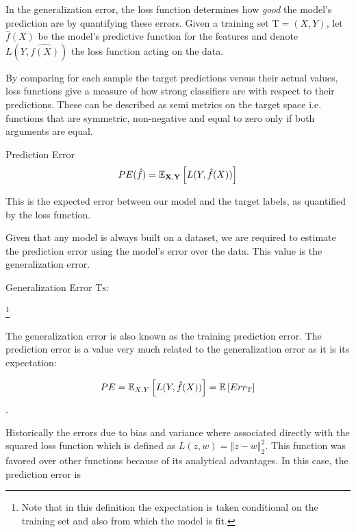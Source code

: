In the generalization error, the loss function  determines how \textit{good} the model's prediction are by quantifying these errors. Given a training set $\mathrm{T} = (X,Y)$, let $\hat{f}(X)$ be the model's predictive function for the features and denote $L( Y,\hat{f(X)} )$ the loss function acting on the data.

By comparing for each sample the target predictions versus their actual values, loss functions give a measure of how strong classifiers are with respect to their predictions. These can be described as semi metrics on the target space i.e. functions that are symmetric, non-negative and equal to zero only if both arguments are equal.


\begin{definition}{Prediction Error}
\[ 
 PE(\hat{f})= \operatorname{\mathbb{E}}_{\textbf{X},\textbf{Y}} \left[ L(Y,\hat{f}(X))\right]
\]
\end{definition}

This is the expected error between our model and the target labels, as quantified by the loss function.

Given that any model is always built on a dataset, we are required to estimate the prediction error using the model's error over the data.  This value is the generalization error.

\begin{definition}{Generalization Error}
 $\mathrm{Ts}$:
\[ 
\]
\end{definition}\footnote{Note that in this definition the expectation is taken conditional on the training set and also from which the model is fit.}

The generalization error is also known as the training prediction error. The prediction error is a value very much related to the generalization error as it is its expectation:

\begin{equation}
 PE = \operatorname{\mathbb{E}}_{X,Y} \left[ L(Y,\hat{f}(X))\right] =  \operatorname{\mathbb{E}} \left[ Err_{\mathrm{T}}  \right]
 \end{equation}.

Historically the errors due to bias and variance where associated directly with the squared loss function which is defined as $L(z,w) = \left\Vert z-w \right\Vert^2_2$. This function was favored over other functions because of its analytical advantages.  In this case, the prediction error is


